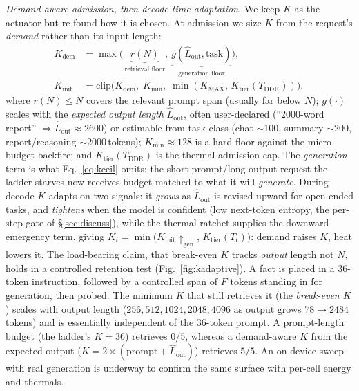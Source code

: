 \documentclass[sigconf, anonymous=false, screen=true]{acmart}
\begin{document}
\emph{Demand-aware admission, then decode-time adaptation.} We keep $K$ as the actuator but re-found how it is chosen. At admission we size $K$ from the request's \emph{demand} rather than its input length:
\begin{equation}
\label{eq:kdemand}
\begin{aligned}
K_\mathrm{dem} &= \max\big(\,\underbrace{r(N)}_{\text{retrieval floor}},\ \underbrace{g(\hat L_\mathrm{out}, \text{task})}_{\text{generation floor}}\big),\\[2pt]
K_\mathrm{init} &= \mathrm{clip}\big(K_\mathrm{dem},\; K_\mathrm{min},\; \min(K_\mathrm{MAX},\, K_\mathrm{tier}(T_\mathrm{DDR}))\big),
\end{aligned}
\end{equation}
where $r(N)\!\le\!N$ covers the relevant prompt span (usually far below $N$); $g(\cdot)$ scales with the \emph{expected output length} $\hat L_\mathrm{out}$, often user-declared (``2000-word report'' $\Rightarrow \hat L_\mathrm{out}\!\approx\!2600$) or estimable from task class (chat $\sim$100, summary $\sim$200, report/reasoning $\sim$2000\,tokens); $K_\mathrm{min}\!\approx\!128$ is a hard floor against the micro-budget backfire; and $K_\mathrm{tier}(T_\mathrm{DDR})$ is the thermal admission cap. The \emph{generation} term is what Eq.~\eqref{eq:kceil} omits: the short-prompt/long-output request the ladder starves now receives budget matched to what it will \emph{generate}. During decode $K$ adapts on two signals: it \emph{grows} as $\hat L_\mathrm{out}$ is revised upward for open-ended tasks, and \emph{tightens} when the model is confident (low next-token entropy, the per-step gate of \S\ref{sec:discuss}), while the thermal ratchet supplies the downward emergency term, giving $K_t = \min\!\big(K_\mathrm{init}\!\uparrow_\text{gen},\, K_\mathrm{tier}(T_t)\big)$: demand raises $K$, heat lowers it. The load-bearing claim, that break-even $K$ tracks \emph{output} length not $N$, holds in a controlled retention test (Fig.~\ref{fig:kadaptive}). A fact is placed in a 36-token instruction, followed by a controlled span of $F$ tokens standing in for generation, then probed. The minimum $K$ that still retrieves it (the \emph{break-even $K$}) scales with output length ($256, 512, 1024, 2048, 4096$ as output grows $78\to2484$ tokens) and is essentially independent of the 36-token prompt. A prompt-length budget (the ladder's $K{=}36$) retrieves $0/5$, whereas a demand-aware $K$ from the expected output ($K\!=\!2{\times}(\text{prompt}{+}\hat L_\mathrm{out})$) retrieves $5/5$. An on-device sweep with real generation is underway to confirm the same surface with per-cell energy and thermals.
\end{document}
